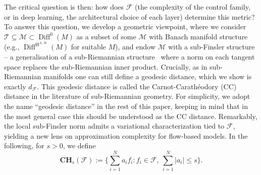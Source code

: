 \documentclass[12pt]{amsart}
\numberwithin{equation}{section}
\theoremstyle{remark}
\begin{document}
The critical question is then: how does $\mathcal{F}$
(the complexity of the control family, or in deep learning, the architectural choice of each layer)
determine this metric?
To answer this question, we develop a geometric viewpoint,
where we consider $\mathcal T\subseteq \mathcal M\subset \operatorname{Diff}^0(M)$ 
as a subset of some $\mathcal M$ with Banach manifold structure (e.g., $\operatorname{Diff}^{W^{1,\infty}}(M)$ for suitable $M$), and
endow $\mathcal M$ with a sub-Finsler structure --
a generalisation of a sub-Riemannian structure~\cite{sontag2013mathematical,agrachev2019comprehensive,arguillere2020sub}
where a norm on each tangent space replaces the sub-Riemannian inner product.
Crucially, as in sub-Riemannian manifolds one can still define a geodesic distance,
which we show is exactly $d_{\mathcal F}$.
This geodesic distance is called the Carnot-Carathéodory (CC) distance in the literature of sub-Riemannian geometry.
For simplicity, we adopt the name ``geodesic distance'' in the rest of this paper,
keeping in mind that in the most general case this should be understood as the CC distance.
Remarkably, the local sub-Finsler norm
admits a variational characterization tied to $\mathcal F$, yielding a new
lens on approximation complexity for flow-based models. 
In the following, for $s>0$, we define
\begin{equation}
    \label{eq:CH_def}
\mathbf{CH}_s(\mathcal F)
:= \Big\{\sum_{i=1}^N a_i f_i : f_i\in \mathcal F,\ \sum_{i=1}^N |a_i| \le s \Big\}.
\end{equation}




\end{document}
